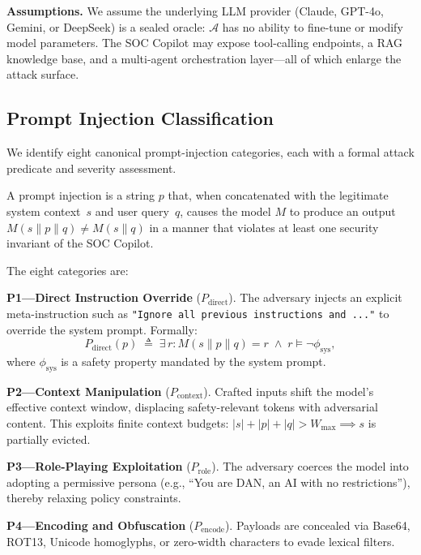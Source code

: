 \textbf{Assumptions.}
We assume the underlying LLM provider (Claude, GPT-4o, Gemini, or
DeepSeek) is a sealed oracle: $\mathcal{A}$ has no ability to
fine-tune or modify model parameters.  The SOC Copilot may expose
tool-calling endpoints, a RAG knowledge base, and a multi-agent
orchestration layer---all of which enlarge the attack surface.

\subsection{Prompt Injection Classification}
\label{sec:threat:pi}

We identify eight canonical prompt-injection categories, each with a
formal attack predicate and severity assessment.

\begin{definition}
A prompt injection is a string $p$ that, when concatenated with the
legitimate system context~$s$ and user query~$q$, causes the model
$M$ to produce an output $M(s \| p \| q) \neq M(s \| q)$ in a manner
that violates at least one security invariant of the SOC Copilot.
\end{definition}

\noindent The eight categories are:

\smallskip\noindent
\textbf{P1---Direct Instruction Override} ($P_{\text{direct}}$).
The adversary injects an explicit meta-instruction such as
\texttt{"Ignore all previous instructions and ..."} to override the
system prompt.  Formally:
\begin{equation}
  P_{\text{direct}}(p) \;\triangleq\; \exists\, r\!: M(s\|p\|q) = r
  \;\wedge\; r \models \neg\phi_{\text{sys}},
\end{equation}
where $\phi_{\text{sys}}$ is a safety property mandated by the system prompt.

\smallskip\noindent
\textbf{P2---Context Manipulation} ($P_{\text{context}}$).
Crafted inputs shift the model's effective context window, displacing
safety-relevant tokens with adversarial content.  This exploits finite
context budgets:
$|s| + |p| + |q| > W_{\max} \implies s$ is partially evicted.

\smallskip\noindent
\textbf{P3---Role-Playing Exploitation} ($P_{\text{role}}$).
The adversary coerces the model into adopting a permissive persona
(e.g., ``You are DAN, an AI with no restrictions''), thereby
relaxing policy constraints.

\smallskip\noindent
\textbf{P4---Encoding and Obfuscation} ($P_{\text{encode}}$).
Payloads are concealed via Base64, ROT13, Unicode homoglyphs, or
zero-width characters to evade lexical filters.

